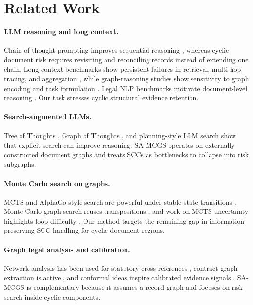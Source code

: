 \documentclass[11pt]{article}
\newcommand{\samcgs}{SA-MCGS}
\newcommand{\scc}{SCC}
\begin{document}
\section{Related Work}
\label{sec:related}

\paragraph{LLM reasoning and long context.}
Chain-of-thought prompting improves sequential reasoning \citep{wei2022chain}, whereas cyclic document risk requires revisiting and reconciling records instead of extending one chain.  Long-context benchmarks show persistent failures in retrieval, multi-hop tracing, and aggregation \citep{liu2024lost,hsieh2024ruler,bai2024longbench}, while graph-reasoning studies show sensitivity to graph encoding and task formulation \citep{wang2023can,fatemi2024talk}.  Legal NLP benchmarks motivate document-level reasoning \citep{hendrycks2021cuad,koreeda2021contractnli,chalkidis2022lexglue,guha2023legalbench}. Our task stresses cyclic structural evidence retention.

\paragraph{Search-augmented LLMs.}
Tree of Thoughts \citep{yao2024tree}, Graph of Thoughts \citep{besta2024graph}, and planning-style LLM search \citep{hao2023reasoning} show that explicit search can improve reasoning.  \samcgs{} operates on externally constructed document graphs and treats \scc{}s as bottlenecks to collapse into risk subgraphs.

\paragraph{Monte Carlo search on graphs.}
MCTS and AlphaGo-style search are powerful under stable state transitions \citep{silver2016mastering,kocsis2006bandit,browne2012survey}.  Monte Carlo graph search reuses transpositions \citep{childs2008transpositions,czech2021monte}, and work on MCTS uncertainty highlights loop difficulty \citep{moerland2020mcts}.  Our method targets the remaining gap in information-preserving \scc{} handling for cyclic document regions.

\paragraph{Graph legal analysis and calibration.}
Network analysis has been used for statutory cross-references \citep{boulet2021measuring}, contract graph extraction is active \citep{dechtiar2025graphgrpolex}, and conformal ideas inspire calibrated evidence signals \citep{vovk2005algorithmic,gibbs2021adaptive}.  \samcgs{} is complementary because it assumes a record graph and focuses on risk search inside cyclic components.
\end{document}
